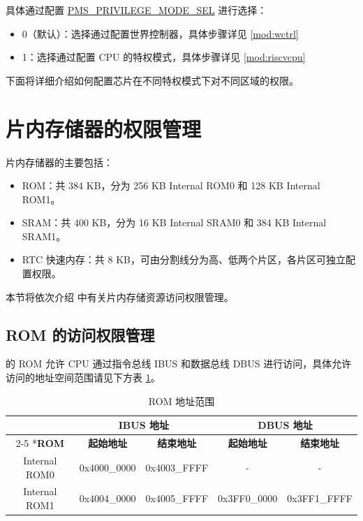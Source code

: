 \documentclass[main\_\_CN.tex]{subfiles}
\begin{document}
具体通过配置 \hyperref[fielddesc:PMSPRIVILEGEMODESEL]{PMS\_PRIVILEGE\_MODE\_SEL} 进行选择：
\begin{itemize}
    \item 0（默认）：选择通过配置世界控制器，具体步骤详见 \ref{mod:wctrl} \textit{}
    \item 1：选择通过配置 CPU 的特权模式，具体步骤详见 \ref{mod:riscvcpu} \textit{}
\end{itemize}

下面将详细介绍如何配置芯片在不同特权模式下对不同区域的权限。


\section{片内存储器的权限管理}

\chipname{} 片内存储器的主要包括：
\begin{itemize}
    \item ROM：共 384 KB，分为 256 KB Internal ROM0 和 128 KB Internal ROM1。
    \item SRAM：共 400 KB，分为 16 KB Internal SRAM0 和 384 KB Internal SRAM1。
    \item RTC 快速内存：共 8 KB，可由分割线分为高、低两个片区，各片区可独立配置权限。
\end{itemize}

本节将依次介绍 \chipname{} 中有关片内存储资源访问权限管理。

\subsection{ROM 的访问权限管理}\label{sec:permctrl-PC-for-ROM}

\chipname{} 的 ROM 允许 CPU 通过指令总线 IBUS 和数据总线 DBUS 进行访问，具体允许访问的地址空间范围请见下方表 \ref{tab:permctrl-ROM_block_address}。

\begin{table}[H]
    \centering
    \caption{ROM 地址范围}
    \label{tab:permctrl-ROM_block_address}

    \begin{tabular}{|*{5}{c|} }
    \hline
        \rowcolor{lightgray}
         & \multicolumn{2}{c|}{\textbf{IBUS 地址}} & \multicolumn{2}{c|}{\textbf{DBUS 地址}} \\\cline{2-5}
        \rowcolor{lightgray}
        \multirow{-2}*{\textbf{ROM}} & \textbf{起始地址} & \textbf{结束地址} & \textbf{起始地址} & \textbf{结束地址} \\\hline

        Internal ROM0  & 0x4000\_0000 & 0x4003\_FFFF & - & - \\\hline
        Internal ROM1  & 0x4004\_0000 & 0x4005\_FFFF & 0x3FF0\_0000 & 0x3FF1\_FFFF \\\hline
        \end{tabular}
    \end{table}
\end{document}
